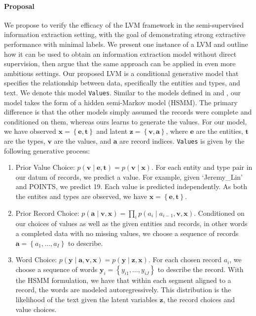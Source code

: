 \documentclass[12pt]{article}
\newcommand\set[1]{\left\{#1\right\}}
\newcommand{\ba}{\mathbf{a}}
\newcommand{\be}{\mathbf{e}}
\newcommand{\bt}{\mathbf{t}}
\newcommand{\bv}{\mathbf{v}}
\newcommand{\bx}{\mathbf{x}}
\newcommand{\by}{\mathbf{y}}
\newcommand{\bz}{\mathbf{z}}
\begin{document}
\paragraph{Proposal}
We propose to verify the efficacy of the LVM framework in the
semi-supervised information extraction setting,
with the goal of demonstrating strong extractive performance with minimal labels.
We present one instance of a LVM and outline how it can be used to obtain
an information extraction model without direct supervision,
then argue that the same approach can be applied in even more ambitious settings.
Our proposed LVM is a conditional generative model that specifies
the relationship between data, specifically the entities and types, and text.
We denote this model \texttt{Values}.
Similar to the models defined in \citet{wiseman2018template} and \citet{liang2009semalign},
our model takes the form of a hidden semi-Markov model (HSMM).
The primary difference is that the other models simply assumed the records
were complete and conditioned on them, whereas ours learns to generate the values.
For our model, we have observed $\bx = \set{\be,\bt}$ and latent $\bz = \set{\bv,\ba}$, 
where $\be$ are the entities, $\bt$ are the types, $\bv$ are the values, and $\ba$ are
record indices.
\texttt{Values} is given by the following generative process:
\begin{enumerate}
\item Prior Value Choice: $p(\bv\mid\be,\bt)=p(\bv\mid\bx)$.
For each entity and type pair in our datum of records, we predict a value.
For example, given `Jeremy\_Lin' and POINTS, we predict 19.
Each value is predicted independently.
As both the entites and types are observed, we have $\bx=\set{\be,\bt}$.
\item Prior Record Choice: $p(\ba\mid\bv,\bx) = \prod_i p(a_i\mid a_{i-1},\bv,\bx)$.
Conditioned on our choices of values as well as the given entities and records,
in other words a completed data with no missing values,
we choose a sequence of records $\ba = \set{a_1,\ldots,a_I}$ to describe.
\item Word Choice: $p(\by\mid\ba,\bv,\bx) = p(\by\mid\bz,\bx)$.
For each chosen record $a_i$,
we choose a sequence of words $\by_i = \set{y_{i1},\ldots,y_{iJ}}$ to describe the record.
With the HSMM formulation, we have that within each segment aligned to a record,
the words are modeled autoregressively.
This distribution is the likelihood of the text given the latent variables $\bz$,
the record choices and value choices.
\end{enumerate}
\end{document}
